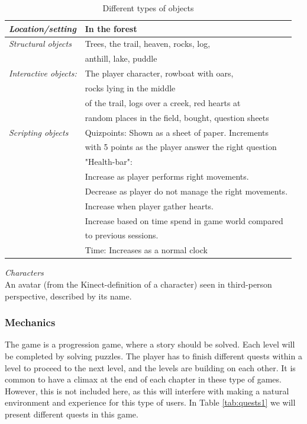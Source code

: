 \begin{table} [H]
\centering
    \begin{tabular}{|l|l|}
       \hline
        \emph{Location/setting} & In the forest  \\ \hline
       \emph{Structural objects} & Trees, the trail, heaven, rocks, log, \\ & anthill, lake, puddle  \\ \hline
       \emph{Interactive objects:} & The player character, rowboat with oars, \\ &  rocks lying in the middle \\ &  of the trail, logs over a creek, red hearts at \\ &  random places in the field, bought, question sheets \\ \hline
	   \emph{Scripting objects} & Quizpoints: Shown as a sheet of paper.  Increments \\ & with 5 points as the  player answer the right question\\ \hline
	     & "Health-bar": \\ & Increase as player performs right movements. \\ & Decrease as player do not manage the right movements. \\ & Increase when player gather hearts. \\ & Increase based on time spend in game world compared \\ & to previous sessions. 
	      \\ \hline
	       & Time: Increases as a normal clock \\ \hline
    \end{tabular}
    \caption[Different types of objects]{Different types of objects}
    \label{tab:objects1}
\end{table}  
 
\emph{Characters} \\
An avatar (from the Kinect-definition of a character) seen in third-person perspective, described by its name. 

\subsubsection{Mechanics} 

The game is a progression game, where a story should be solved. Each level will be completed by solving puzzles. The player has to finish different quests within a level to proceed to the next level, and the levels are building on each other. It is common to have a climax at the end of each chapter in these type of games. However, this is not included here, as this will interfere with making a natural environment and experience for this type of users. In Table \ref{tab:quests1} we will present different quests in this game. 
  

